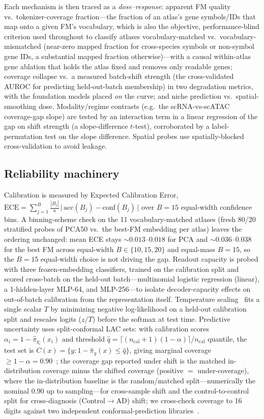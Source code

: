 \documentclass[fleqn,10pt,lineno]{wlpeerj}  %
\begin{document}
Each mechanism is then traced as a \emph{dose--response}: apparent FM quality vs.\ tokenizer-coverage fraction---the fraction of an atlas's gene symbols/IDs that map onto a given FM's vocabulary, which is also the objective, performance-blind criterion used throughout to classify atlases vocabulary-matched vs.\ vocabulary-mismatched (near-zero mapped fraction for cross-species symbols or non-symbol gene IDs, a substantial mapped fraction otherwise)---with a causal within-atlas gene ablation that holds the atlas fixed and removes only readable genes; coverage collapse vs.\ a measured batch-shift strength (the cross-validated AUROC for predicting held-out-batch membership) in two degradation metrics, with the foundation models placed \emph{on} the curve; and niche prediction vs.\ spatial-smoothing dose. Modality/regime contrasts (e.g.\ the scRNA-vs-scATAC coverage-gap slope) are tested by an interaction term in a linear regression of the gap on shift strength (a slope-difference $t$-test), corroborated by a label-permutation test on the slope difference. Spatial probes use spatially-blocked cross-validation to avoid leakage.

\subsection{Reliability machinery}
Calibration is measured by Expected Calibration Error, $\mathrm{ECE}=\sum_{j=1}^{B}\frac{|B_j|}{n}\,\big|\,\mathrm{acc}(B_j)-\mathrm{conf}(B_j)\,\big|$ over $B{=}15$ equal-width confidence bins. A binning-scheme check on the 11 vocabulary-matched atlases (fresh 80/20 stratified probes of PCA50 vs.\ the best-FM embedding per atlas) leaves the ordering unchanged: mean ECE stays ${\sim}0.013$--$0.018$ for PCA and ${\sim}0.036$--$0.038$ for the best FM across equal-width $B\in\{10,15,20\}$ and equal-mass $B{=}15$, so the $B{=}15$ equal-width choice is not driving the gap. Readout capacity is probed with three frozen-embedding classifiers, trained on the calibration split and scored cross-batch on the held-out batch---multinomial logistic regression (linear), a 1-hidden-layer MLP-64, and MLP-256---to isolate decoder-capacity effects on out-of-batch calibration from the representation itself. Temperature scaling~\cite{guo2017} fits a single scalar $T$ by minimizing negative log-likelihood on a held-out calibration split and rescales logits ($z/T$) before the softmax at test time. Predictive uncertainty uses split-conformal LAC sets: with calibration scores $\alpha_i = 1-\hat\pi_{y_i}(x_i)$ and threshold $\hat q = \lceil (n_{\mathrm{cal}}{+}1)(1{-}\alpha)\rceil/n_{\mathrm{cal}}$ quantile, the test set is $C(x)=\{y:1-\hat\pi_y(x)\le\hat q\}$, giving marginal coverage $\ge 1-\alpha=0.90$~\cite{angelopoulos2023}; the coverage gap reported under shift is the matched in-distribution coverage minus the shifted coverage (positive $=$ under-coverage), where the in-distribution baseline is the random/matched split---numerically the nominal $0.90$ up to sampling---for cross-sample shift and the control-to-control split for cross-diagnosis (Control$\to$AD) shift; we cross-check coverage to 16 digits against two independent conformal-prediction libraries~\cite{crepes,mapie}.
\end{document}
